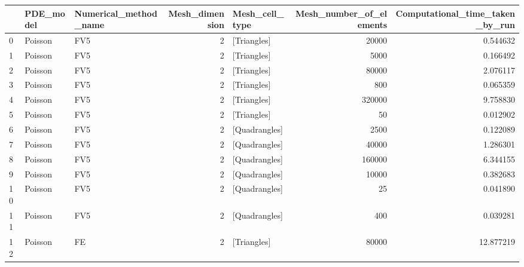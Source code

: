 \begin{tabular}{lllrlrr}
\toprule
{} & PDE\_model & Numerical\_method\_name &  Mesh\_dimension & Mesh\_cell\_type &  Mesh\_number\_of\_elements &  Computational\_time\_taken\_by\_run \\
\midrule
0  &   Poisson &                   FV5 &               2 &    [Triangles] &                    20000 &                         0.544632 \\
1  &   Poisson &                   FV5 &               2 &    [Triangles] &                     5000 &                         0.166492 \\
2  &   Poisson &                   FV5 &               2 &    [Triangles] &                    80000 &                         2.076117 \\
3  &   Poisson &                   FV5 &               2 &    [Triangles] &                      800 &                         0.065359 \\
4  &   Poisson &                   FV5 &               2 &    [Triangles] &                   320000 &                         9.758830 \\
5  &   Poisson &                   FV5 &               2 &    [Triangles] &                       50 &                         0.012902 \\
6  &   Poisson &                   FV5 &               2 &  [Quadrangles] &                     2500 &                         0.122089 \\
7  &   Poisson &                   FV5 &               2 &  [Quadrangles] &                    40000 &                         1.286301 \\
8  &   Poisson &                   FV5 &               2 &  [Quadrangles] &                   160000 &                         6.344155 \\
9  &   Poisson &                   FV5 &               2 &  [Quadrangles] &                    10000 &                         0.382683 \\
10 &   Poisson &                   FV5 &               2 &  [Quadrangles] &                       25 &                         0.041890 \\
11 &   Poisson &                   FV5 &               2 &  [Quadrangles] &                      400 &                         0.039281 \\
12 &   Poisson &                    FE &               2 &    [Triangles] &                    80000 &                        12.877219 \\

\end{tabular}
